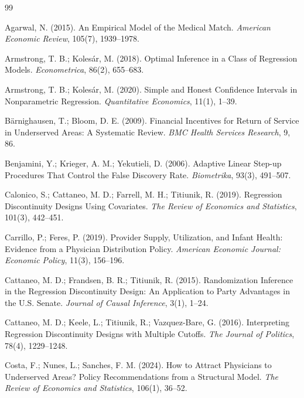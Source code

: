 \documentclass[11pt,a4paper]{article}
\begin{document}
\begin{thebibliography}{99}

Agarwal, N. (2015). An Empirical Model of the Medical Match.
\textit{American Economic Review}, 105(7), 1939--1978.

Armstrong, T. B.; Kolesár, M. (2018). Optimal Inference in a Class of
Regression Models. \textit{Econometrica}, 86(2), 655--683.

Armstrong, T. B.; Kolesár, M. (2020). Simple and Honest Confidence Intervals
in Nonparametric Regression. \textit{Quantitative Economics}, 11(1), 1--39.

Bärnighausen, T.; Bloom, D. E. (2009). Financial Incentives for Return of
Service in Underserved Areas: A Systematic Review.
\textit{BMC Health Services Research}, 9, 86.

Benjamini, Y.; Krieger, A. M.; Yekutieli, D. (2006). Adaptive Linear Step-up
Procedures That Control the False Discovery Rate.
\textit{Biometrika}, 93(3), 491--507.

Calonico, S.; Cattaneo, M. D.; Farrell, M. H.; Titiunik, R. (2019).
Regression Discontinuity Designs Using Covariates.
\textit{The Review of Economics and Statistics}, 101(3), 442--451.

Carrillo, P.; Feres, P. (2019). Provider Supply, Utilization, and Infant
Health: Evidence from a Physician Distribution Policy.
\textit{American Economic Journal: Economic Policy}, 11(3), 156--196.

Cattaneo, M. D.; Frandsen, B. R.; Titiunik, R. (2015). Randomization
Inference in the Regression Discontinuity Design: An Application to Party
Advantages in the U.S. Senate. \textit{Journal of Causal Inference}, 3(1),
1--24.

Cattaneo, M. D.; Keele, L.; Titiunik, R.; Vazquez-Bare, G. (2016).
Interpreting Regression Discontinuity Designs with Multiple Cutoffs.
\textit{The Journal of Politics}, 78(4), 1229--1248.

Costa, F.; Nunes, L.; Sanches, F. M. (2024). How to Attract Physicians to
Underserved Areas? Policy Recommendations from a Structural Model.
\textit{The Review of Economics and Statistics}, 106(1), 36--52.


\end{thebibliography}
\end{document}
